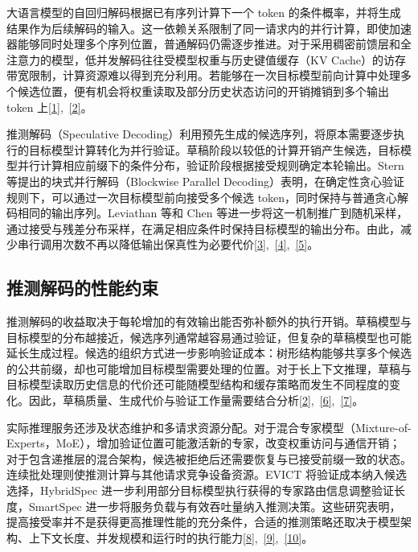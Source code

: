 \documentclass[11pt,a4paper,UTF8,fontset=none,scheme=plain,zihao=-4]{ctexart}
\begin{document}
大语言模型的自回归解码根据已有序列计算下一个 token
的条件概率，并将生成结果作为后续解码的输入。这一依赖关系限制了同一请求内的并行计算，即使加速器能够同时处理多个序列位置，普通解码仍需逐步推进。对于采用稠密前馈层和全注意力的模型，低并发解码往往受模型权重与历史键值缓存（KV
Cache）的访存带宽限制，计算资源难以得到充分利用。若能够在一次目标模型前向计算中处理多个候选位置，便有机会将权重读取及部分历史状态访问的开销摊销到多个输出
token 上\protect\hyperlink{ref-pagedattention}{{[}1{]}},~\protect\hyperlink{ref-magicdec}{{[}2{]}}。

推测解码（Speculative
Decoding）利用预先生成的候选序列，将原本需要逐步执行的目标模型计算转化为并行验证。草稿阶段以较低的计算开销产生候选，目标模型并行计算相应前缀下的条件分布，验证阶段根据接受规则确定本轮输出。Stern
等提出的块式并行解码（Blockwise Parallel
Decoding）表明，在确定性贪心验证规则下，可以通过一次目标模型前向接受多个候选
token，同时保持与普通贪心解码相同的输出序列。Leviathan 等和 Chen
等进一步将这一机制推广到随机采样，通过接受与残差分布采样，在满足相应条件时保持目标模型的输出分布。由此，减少串行调用次数不再以降低输出保真性为必要代价\protect\hyperlink{ref-blockwise}{{[}3{]}},~\protect\hyperlink{ref-leviathan}{{[}4{]}},~\protect\hyperlink{ref-chen}{{[}5{]}}。

\hypertarget{section-1-2}{%
\subsection{推测解码的性能约束}\label{section-1-2}}

推测解码的收益取决于每轮增加的有效输出能否弥补额外的执行开销。草稿模型与目标模型的分布越接近，候选序列通常越容易通过验证，但复杂的草稿模型也可能延长生成过程。候选的组织方式进一步影响验证成本：树形结构能够共享多个候选的公共前缀，却也可能增加目标模型需要处理的位置。对于长上下文推理，草稿与目标模型读取历史信息的代价还可能随模型结构和缓存策略而发生不同程度的变化。因此，草稿质量、生成代价与验证工作量需要结合分析\protect\hyperlink{ref-magicdec}{{[}2{]}},~\protect\hyperlink{ref-eagle3}{{[}6{]}},~\protect\hyperlink{ref-specinfer}{{[}7{]}}。

实际推理服务还涉及状态维护和多请求资源分配。对于混合专家模型（Mixture-of-Experts，MoE），增加验证位置可能激活新的专家，改变权重访问与通信开销；对于包含递推层的混合架构，候选被拒绝后还需要恢复与已接受前缀一致的状态。连续批处理则使推测计算与其他请求竞争设备资源。EVICT
将验证成本纳入候选选择，HybridSpec
进一步利用部分目标模型执行获得的专家路由信息调整验证长度，SmartSpec
进一步将服务负载与有效吞吐量纳入推测决策。这些研究表明，提高接受率并不是获得更高推理性能的充分条件，合适的推测策略还取决于模型架构、上下文长度、并发规模和运行时的执行能力\protect\hyperlink{ref-evict}{{[}8{]}},~\protect\hyperlink{ref-hybridspec}{{[}9{]}},~\protect\hyperlink{ref-smartspec}{{[}10{]}}。
\end{document}
